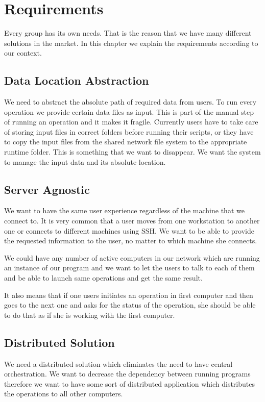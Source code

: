 \chapter{Requirements}
\label{cha:requirements}

Every group has its own needs. That is the reason that we have many different solutions in the market.
In this chapter we explain the requirements according to our context.

\section{Data Location Abstraction}
We need to abstract the absolute path of required data from users. To run every operation
we provide certain data files as input. This is part of the manual step of running an operation and
it makes it fragile. Currently users have to take care of storing input files in correct folders before
running their scripts, or they have to copy the input files from the shared network file system to the
appropriate runtime folder. This is something that we want to disappear. We want the system to 
manage the input data and its absolute location.

\section{Server Agnostic}
We want to have the same user experience regardless of the machine that we connect to. It is very common
that a user moves from one workstation to another one or connects to different machines using SSH. We 
want to be able to provide the requested information to the user, no matter to which machine she connects.

We could have any number of active computers in our network which are running an instance of our program
and we want to let the users to talk to each of them and be able to launch same operations and get the same result.

It also means that if one users initiates an operation in first computer and then goes to the next one and asks
for the status of the operation, she should be able to do that as if she is working with the first computer.

\section{Distributed Solution}
We need a distributed solution which eliminates the need to have central orchestration.
We want to decrease the dependency between running programs therefore we want to have 
some sort of distributed application which distributes the operations to all other computers.

